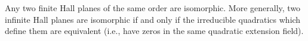 Any two finite Hall planes of the same order are isomorphic. More generally, two infinite Hall planes are isomorphic if and only if the irreducible quadratics which define them are equivalent (i.e., have zeros in the same quadratic extension field).
